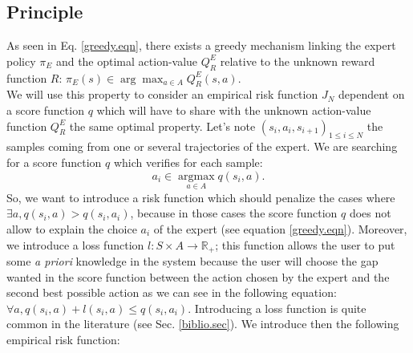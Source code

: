 \documentclass{article}
\newcommand{\argmax}{\operatorname*{argmax}} %
\begin{document}
\subsection{Principle}
As seen in Eq. \eqref{greedy.eqn}, there exists a greedy mechanism linking the expert policy $\pi_E$ and the optimal action-value $Q^E_R$ relative to the unknown reward function $R$: $\pi_E(s) \in \arg\max_{a\in A}Q^E_R(s,a)$.\\
We will use this property to consider an empirical risk function $J_N$ dependent on a score function $q$ which will have to share with the unknown action-value function $Q^E_R$ the same optimal property. Let's note $(s_i,a_i,s_{i+1})_{1\leq i\leq N}$ the samples coming from one or several  trajectories of the expert. We are searching for a score function $q$ which verifies for each sample:
\begin{equation}
\label{butLAFEM.eqn}
a_i \in \argmax_{a\in A}q(s_i,a).
\end{equation}
So, we want to introduce a risk function which should penalize the cases where $\exists a, q(s_i,a)>q(s_i,a_i)$, because in those cases the score function $q$ does not allow to explain the choice $a_i$ of the expert (see equation \eqref{greedy.eqn}). Moreover, we introduce a loss function $l: S \times A \rightarrow \mathbb{R}_+$; this function allows the user to put some \emph{a priori} knowledge in the system because the user will choose the gap wanted in the score function between the action chosen by the expert and the second best possible action as we can see in the following equation: $\forall a, q(s_i,a) + l(s_i,a) \leq q(s_i,a_i)$. Introducing a loss function is quite common in the literature (see Sec. \ref{biblio.sec}). We introduce then the following empirical risk function:
\end{document}
